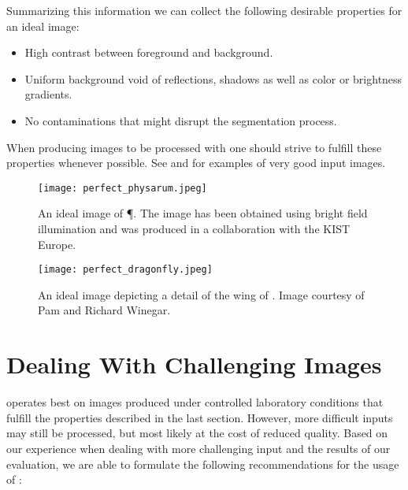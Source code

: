 	Summarizing this information we can collect the following desirable properties for an ideal image:

	\begin{itemize}
		\item High contrast between foreground and background.
		\item Uniform background void of reflections, shadows as well as color or brightness gradients.
		\item No contaminations that might disrupt the segmentation process.
	\end{itemize}

	When producing images to be processed with \NEFI one should strive to fulfill these properties whenever possible. See  and  for examples of very good input images.

	\begin{figure}
		\centering
		\texttt{[image: perfect\_physarum.jpeg]}
		\caption[\NEFIs caveats: An ideal iamge of \P.]{An ideal image of \P. The image has been obtained using bright field illumination and was produced in a collaboration with the KIST Europe.}
		\label{fig:sup:good1}
	\end{figure}

	\begin{figure}
		\centering
		\texttt{[image: perfect\_dragonfly.jpeg]}
		\caption[\NEFIs caveats: An ideal iamge of \A.]{An ideal image depicting a detail of the wing of \A. Image courtesy of Pam and Richard Winegar.}
		\label{fig:sup:good2}
	\end{figure}
 
\section{Dealing With Challenging Images}

	\NEFI operates best on images produced under controlled laboratory conditions that fulfill the properties described in the last section. However, more difficult inputs may still be processed, but most likely at the cost of reduced quality. Based on our experience when dealing with more challenging input and the results of our evaluation, we are able to formulate the following recommendations for the usage of \NEFI:

